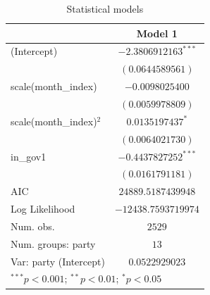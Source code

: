 
\begin{table}
\begin{center}
\begin{tabular}{l c}
\hline
 & Model 1 \\
\hline
(Intercept)             & $-2.3806912163^{***}$ \\
                        & $(0.0644589561)$      \\
scale(month\_index)     & $-0.0098025400$       \\
                        & $(0.0059978809)$      \\
scale(month\_index)$^2$ & $0.0135197437^{*}$    \\
                        & $(0.0064021730)$      \\
in\_gov1                & $-0.4437827252^{***}$ \\
                        & $(0.0161791181)$      \\
\hline
AIC                     & $24889.5187439948$    \\
Log Likelihood          & $-12438.7593719974$   \\
Num. obs.               & $2529$                \\
Num. groups: party      & $13$                  \\
Var: party (Intercept)  & $0.0522929023$        \\
\hline
\multicolumn{2}{l}{\scriptsize{$^{***}p<0.001$; $^{**}p<0.01$; $^{*}p<0.05$}}
\end{tabular}
\caption{Statistical models}
\label{table:coefficients}
\end{center}
\end{table}
